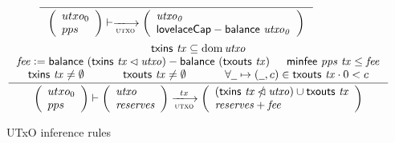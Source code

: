 \begin{figure}
  \begin{equation}\label{eq:utxo-bootstrap}
    \inference
    {
    }
    {
      {\left(\begin{array}{l}
        utxo_0\\
        pps
      \end{array}\right)}
      \vdash
      \trans{utxo}{}
      \left(
        \begin{array}{l}
          \var{utxo_0}\\
          \fun{lovelaceCap} - \balance{utxo_0}
        \end{array}
      \right)
    }
  \end{equation}
  \nextdef
  \begin{equation}\label{eq:utxo-inductive}
    \inference
    { \txins{tx} \subseteq \dom \var{utxo}\\
      \var{fee} \leteq \balance{(\txins{tx} \restrictdom \var{utxo})} - \balance{(\txouts{tx})}
      & \minfee{pps}{tx} \leq \var{fee}\\
      \txins{tx} \neq \emptyset
      & \txouts{tx} \neq \emptyset
      & \forall \wcard \mapsto (\wcard, c) \in \txouts{tx} \cdot 0 < c
    }
    {
      {\left(\begin{array}{l}
        utxo_0\\
        pps
       \end{array}\right)}
      \vdash
      \left(
          \begin{array}{l}
            \var{utxo}\\
            \var{reserves}
          \end{array}
      \right)
      \trans{utxo}{tx}
      \left(
        \begin{array}{l}
          (\txins{tx} \subtractdom \var{utxo}) \cup \txouts{tx}\\
          \var{reserves + \var{fee}}
        \end{array}
      \right)
    }
  \end{equation}
  \caption{UTxO inference rules}
  \label{fig:rules:utxo}
\end{figure}

